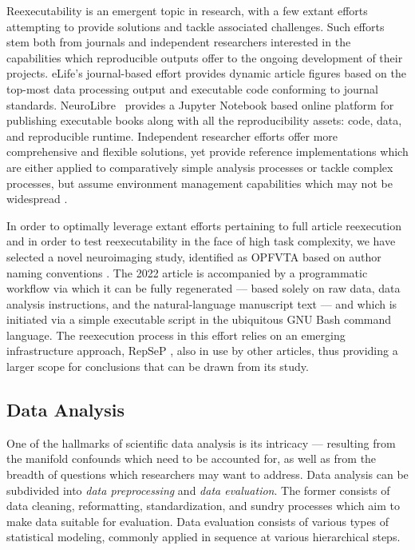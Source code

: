 Reexecutability is an emergent topic in research, with a few extant efforts attempting to provide solutions and tackle associated challenges.
Such efforts stem both from journals and independent researchers interested in the capabilities which reproducible outputs offer to the ongoing development of their projects.
eLife's journal-based effort \cite{eliferep} provides dynamic article figures based on the top-most data processing output and executable code conforming to journal standards.
NeuroLibre~\cite{neurolibre} provides a Jupyter Notebook based online platform for publishing executable books along with all the reproducibility assets: code, data, and reproducible runtime.
Independent researcher efforts offer more comprehensive and flexible solutions, yet provide reference implementations which are either applied to comparatively simple analysis processes \cite{Dar2019} or tackle complex processes, but assume environment management capabilities which may not be widespread \cite{repsep}.

In order to optimally leverage extant efforts pertaining to full article reexecution and in order to test reexecutability in the face of high task complexity, we have selected a novel neuroimaging study, identified as OPFVTA based on author naming conventions \cite{opfvta}.
The 2022 article is accompanied by a programmatic workflow via which it can be fully regenerated — based solely on raw data, data analysis instructions, and the natural-language manuscript text — and which is initiated via a simple executable script in the ubiquitous GNU Bash \cite{bash} command language.
The reexecution process in this effort relies on an emerging infrastructure approach, RepSeP \cite{repsep}, also in use by other articles, thus providing a larger scope for conclusions that can be drawn from its study.


\subsection{Data Analysis}

One of the hallmarks of scientific data analysis is its intricacy — resulting from the manifold confounds which need to be accounted for, as well as from the breadth of questions which researchers may want to address.
Data analysis can be subdivided into \emph{data preprocessing} and \emph{data evaluation}.
The former consists of data cleaning, reformatting, standardization, and sundry processes which aim to make data suitable for evaluation.
Data evaluation consists of various types of statistical modeling, commonly applied in sequence at various hierarchical steps.

